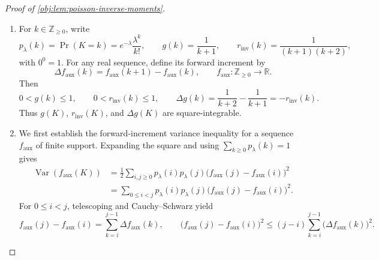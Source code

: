 \documentclass[11pt]{article}
\begin{document}
\begin{proof}[Proof of \cref{obj:lem:poisson-inverse-moments}]
\begin{enumerate}
\item For \(k\in\mathbb Z_{\ge0}\), write
\[
p_\lambda(k)=\Pr(K=k)=e^{-\lambda}\frac{\lambda^k}{k!},
\qquad
g(k)=\frac1{k+1},
\qquad
r_{\mathrm{inv}}(k)=\frac1{(k+1)(k+2)},
\]
with \(0^0=1\). For any real sequence, define its forward increment by
\[
\Delta f_{\mathrm{aux}}(k)
=f_{\mathrm{aux}}(k+1)-f_{\mathrm{aux}}(k),
\qquad
f_{\mathrm{aux}}\colon\mathbb Z_{\ge0}\to\mathbb R.
\]
Then
\[
0<g(k)\le1,\qquad 0<r_{\mathrm{inv}}(k)\le1,
\qquad
\Delta g(k)
=\frac1{k+2}-\frac1{k+1}
=-r_{\mathrm{inv}}(k).
\]
Thus \(g(K)\), \(r_{\mathrm{inv}}(K)\), and \(\Delta g(K)\) are square-integrable. %

\item We first establish the forward-increment variance inequality for a sequence \(f_{\mathrm{aux}}\) of finite support. Expanding the square and using \(\sum_{k\ge0}p_\lambda(k)=1\) gives
\[
\begin{aligned}
\operatorname{Var}(f_{\mathrm{aux}}(K))
&=\frac12\sum_{i,j\ge0}p_\lambda(i)p_\lambda(j)
  \bigl(f_{\mathrm{aux}}(j)-f_{\mathrm{aux}}(i)\bigr)^2\\
&=\sum_{0\le i<j}p_\lambda(i)p_\lambda(j)
  \bigl(f_{\mathrm{aux}}(j)-f_{\mathrm{aux}}(i)\bigr)^2.
\end{aligned}
\]
For \(0\le i<j\), telescoping and Cauchy--Schwarz yield
\[
f_{\mathrm{aux}}(j)-f_{\mathrm{aux}}(i)
=\sum_{k=i}^{j-1}\Delta f_{\mathrm{aux}}(k),
\qquad
\bigl(f_{\mathrm{aux}}(j)-f_{\mathrm{aux}}(i)\bigr)^2
\le (j-i)\sum_{k=i}^{j-1}\bigl(\Delta f_{\mathrm{aux}}(k)\bigr)^2.
\]


\end{enumerate}
\end{proof}
\end{document}
